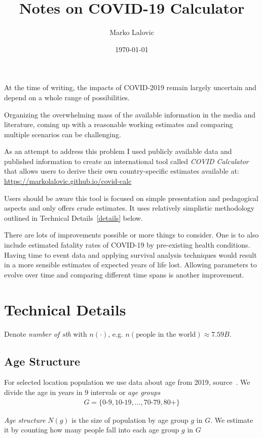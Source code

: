 \documentclass[12pt]{article}
\title{Notes on COVID-19 Calculator}
\author{Marko Lalovic}
\date{\today}
\begin{document}
\maketitle

 At the time of writing, the impacts of COVID-2019 remain largely uncertain and depend on a whole range of possibilities.

Organizing the overwhelming mass of the available information in the media and literature,
coming up with a reasonable working estimates and comparing multiple scenarios can be challenging.

As an attempt to address this problem I used publicly available data and published information
to create an international tool called {\it COVID Calculator} that allows users to derive their own country-specific estimates available at: \url{https://markolalovic.github.io/covid-calc}

Users should be aware this tool is focused on simple presentation and pedagogical aspects and only offers crude estimates. It uses relatively simplistic methodology outlined in Technical Details~\ref{details} below.

There are lots of improvements possible or more things to consider. One is to also include estimated fatality rates of COVID-19 by pre-existing health conditions. Having time to event data and applying survival analysis techniques would result in a more sensible estimates of expected years of life lost. Allowing parameters to evolve over time and comparing different time spans is another improvement.

\section*{Technical Details}\label{details}
Denote {\it number of sth} with $n(\cdot)$, e.g. $n(\text{people in the world}) \approx 7.59B$.

\subsection*{Age Structure}
For selected location population we use data about age from 2019, source~\cite{pyramids}. We divide the age in years in 9 intervals or {\it age groups}
\begin{align*}
G =
  \{ \text{0-9}, \text{10-19}, \ldots, \text{70-79}, \text{80+} \}
\end{align*}

{\it Age structure} $N(g)$ is the size of population by age group $g$ in $G$. We estimate it by counting how many people fall into each age group $g$ in $G$
\end{document}
